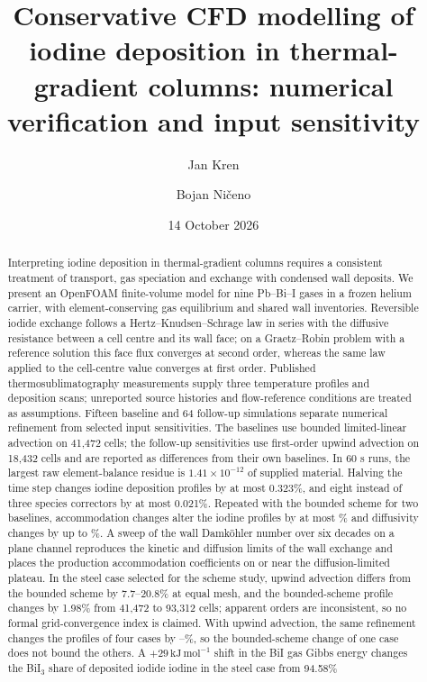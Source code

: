 \documentclass{article}
\title{Conservative CFD modelling of iodine deposition in thermal-gradient
columns: numerical verification and input sensitivity}
\author[1]{Jan Kren}
\author[1]{Bojan Ni\v{c}eno}
\affil[1]{Paul Scherrer Institute, 5232 Villigen PSI, Switzerland}
\date{14 October 2026}
\newcommand{\units}[1]{\,\mathrm{#1}}
\begin{document}
\raggedbottom
\maketitle
\begin{abstract}
Interpreting iodine deposition in thermal-gradient columns requires a
consistent treatment of transport, gas speciation and exchange with
condensed wall deposits. We present an OpenFOAM finite-volume model
for nine Pb--Bi--I gases in a frozen helium carrier, with
element-conserving gas equilibrium and shared wall inventories.
Reversible iodide exchange follows a Hertz--Knudsen--Schrage law in
series with the diffusive resistance between a cell centre and its
wall face; on a Graetz--Robin problem with a reference solution this
face flux converges at second order, whereas the same law applied to the
cell-centre value converges at first order. Published thermosublimatography measurements supply three
temperature profiles and deposition scans; unreported source histories
and flow-reference conditions are treated as assumptions. Fifteen
baseline and 64 follow-up simulations separate numerical refinement
from selected input sensitivities. The baselines use bounded
limited-linear advection on 41,472 cells; the follow-up sensitivities
use first-order upwind advection on 18,432 cells and are reported as
differences from their own baselines. In 60 s runs, the largest raw
element-balance residue is $1.41\times10^{-12}$ of supplied material.
Halving the time step changes iodine deposition profiles by at most
0.323\%, and eight instead of three species correctors by at most
0.021\%. Repeated with the bounded scheme for two baselines,
accommodation changes alter the iodine profiles by at most
\PSAlphaTwoMax\% and diffusivity changes by up to \PSDMax\%. A sweep of
the wall Damk\"ohler number over six decades on a plane channel
reproduces the kinetic and diffusion limits of the wall exchange and
places the production accommodation coefficients on or near the
diffusion-limited plateau.
In the steel case selected for the scheme study, upwind advection
differs from the bounded scheme by 7.7--20.8\% at equal mesh, and the
bounded-scheme profile changes by 1.98\% from 41,472 to 93,312 cells;
apparent orders are inconsistent, so no formal grid-convergence index is
claimed. With upwind advection, the same refinement changes the
profiles of four cases by \SteelUpThree--\UpFourOthersMax\%, so the
bounded-scheme change of one case does not bound the others. A
$+29\units{kJ\,mol^{-1}}$ shift in the BiI gas Gibbs energy changes the
BiI$_3$ share of deposited iodide iodine in the steel case from 94.58\%

\end{abstract}
\end{document}

